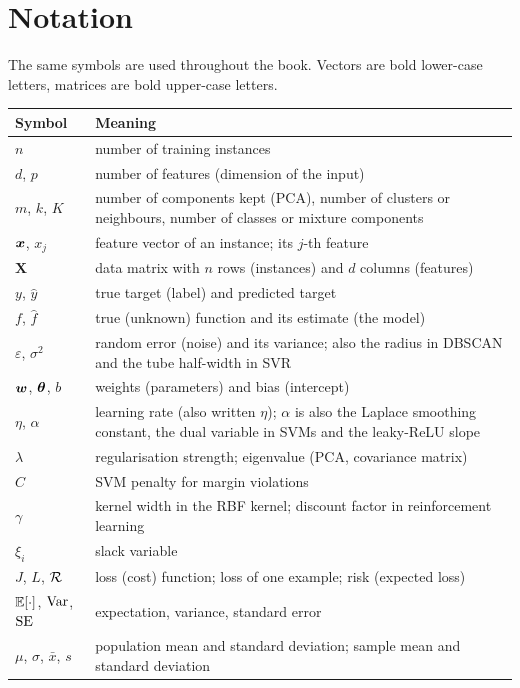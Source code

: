 \chapter*{Notation}

The same symbols are used throughout the book. Vectors are bold lower-case letters, matrices are bold upper-case letters.

\small
\begin{longtable}{@{}p{2.6cm}p{11.4cm}@{}}
\toprule
\textbf{Symbol} & \textbf{Meaning}\\
\midrule
\endhead
$n$ & number of training instances\\
$d$, $p$ & number of features (dimension of the input)\\
$m$, $k$, $K$ & number of components kept (PCA), number of clusters or neighbours, number of classes or mixture components\\
$\boldsymbol{x}$, $x_j$ & feature vector of an instance; its $j$-th feature\\
$\mathbf X$ & data matrix with $n$ rows (instances) and $d$ columns (features)\\
$y$, $\hat y$ & true target (label) and predicted target\\
$f$, $\hat f$ & true (unknown) function and its estimate (the model)\\
$\varepsilon$, $\sigma^2$ & random error (noise) and its variance; also the radius in DBSCAN and the tube half-width in SVR\\
$\boldsymbol{w}$, $\boldsymbol{\theta}$, $b$ & weights (parameters) and bias (intercept)\\
$\eta$, $\alpha$ & learning rate (also written $\eta$); $\alpha$ is also the Laplace smoothing constant, the dual variable in SVMs and the leaky-ReLU slope\\
$\lambda$ & regularisation strength; eigenvalue (PCA, covariance matrix)\\
$C$ & SVM penalty for margin violations\\
$\gamma$ & kernel width in the RBF kernel; discount factor in reinforcement learning\\
$\xi_i$ & slack variable\\
$J$, $L$, $\mathcal{R}$ & loss (cost) function; loss of one example; risk (expected loss)\\
$\mathbb{E}[\cdot]$, $\operatorname{Var}$, $\operatorname{SE}$ & expectation, variance, standard error\\
$\mu$, $\sigma$, $\bar x$, $s$ & population mean and standard deviation; sample mean and standard deviation\\

\end{longtable}
